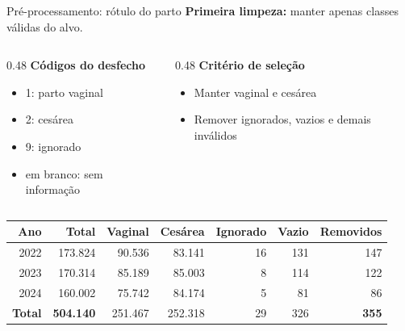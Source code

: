 \documentclass[aspectratio=169,xcolor=table]{beamer}
\begin{document}
\begin{frame}{Pré-processamento: rótulo do parto}
    \textbf{Primeira limpeza:} manter apenas classes válidas do alvo.

    \vspace{0.4em}
    \begin{columns}[T]
        \begin{column}{0.48\textwidth}
            \textbf{Códigos do desfecho}
            \begin{itemize}
                \item 1: parto vaginal
                \item 2: cesárea
                \item 9: ignorado
                \item em branco: sem informação
            \end{itemize}
        \end{column}
        \begin{column}{0.48\textwidth}
            \textbf{Critério de seleção}
            \begin{itemize}
                \item \textcolor{green!50!black}{Manter} vaginal e cesárea
                \item \textcolor{red!70!black}{Remover} ignorados, vazios e demais inválidos
            \end{itemize}
        \end{column}
    \end{columns}

    \vspace{0.6em}
    \begin{table}
        \centering
        \small
        \begin{tabular}{rrrrrrr}
            \toprule
            Ano & Total & Vaginal & Cesárea & Ignorado & Vazio & Removidos \\
            \midrule
            2022 & 173.824 & 90.536 & 83.141 & 16 & 131 & 147 \\
            2023 & 170.314 & 85.189 & 85.003 & 8 & 114 & 122 \\
            2024 & 160.002 & 75.742 & 84.174 & 5 & 81 & 86 \\
            \midrule
            \textbf{Total} & \textbf{504.140} & 251.467 & 252.318 & 29 & 326 & \textbf{355} \\
            \bottomrule
        \end{tabular}
    \end{table}
\end{frame}
\end{document}
